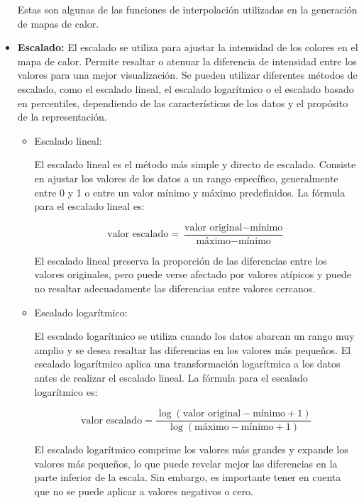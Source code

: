 \documentclass{article}
\begin{document}
\begin{itemize}
Estas son algunas de las funciones de interpolación utilizadas en la generación de mapas de calor.
\item\textbf{Escalado: } El escalado se utiliza para ajustar la intensidad de los colores en el mapa de calor. Permite resaltar o atenuar la diferencia de intensidad entre los valores para una mejor visualización. Se pueden utilizar diferentes métodos de escalado, como el escalado lineal, el escalado logarítmico o el escalado basado en percentiles, dependiendo de las características de los datos y el propósito de la representación.

\begin{itemize}
\item Escalado lineal:

El escalado lineal es el método más simple y directo de escalado. Consiste en ajustar los valores de los datos a un rango específico, generalmente entre 0 y 1 o entre un valor mínimo y máximo predefinidos. La fórmula para el escalado lineal es:

\begin{equation}
    \textrm{valor escalado} = \frac{\textrm{valor original} - \textrm{mínimo}}{\textrm{máximo} - \textrm{mínimo}}
\end{equation}

El escalado lineal preserva la proporción de las diferencias entre los valores originales, pero puede verse afectado por valores atípicos y puede no resaltar adecuadamente las diferencias entre valores cercanos.

\item Escalado logarítmico:

El escalado logarítmico se utiliza cuando los datos abarcan un rango muy amplio y se desea resaltar las diferencias en los valores más pequeños. El escalado logarítmico aplica una transformación logarítmica a los datos antes de realizar el escalado lineal. La fórmula para el escalado logarítmico es:

\begin{equation}
    \textrm{valor escalado} = \frac{\log(\textrm{valor original} - \textrm{mínimo} + 1)}{\log(\textrm{máximo} - \textrm{mínimo} + 1)}
\end{equation}

El escalado logarítmico comprime los valores más grandes y expande los valores más pequeños, lo que puede revelar mejor las diferencias en la parte inferior de la escala. Sin embargo, es importante tener en cuenta que no se puede aplicar a valores negativos o cero.


\end{itemize}
\end{itemize}
\end{document}
